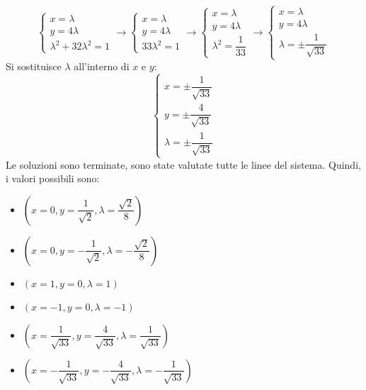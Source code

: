 \documentclass[a4paper]{article}
\begin{document}
	\begin{equation*}
		\begin{cases}
			x = \lambda \\
			y = 4\lambda \\
			\lambda^{2} + 32\lambda^{2} = 1
		\end{cases}
		\longrightarrow
		\begin{cases}
			x = \lambda \\
			y = 4\lambda \\
			33\lambda^{2} = 1
		\end{cases}
		\longrightarrow
		\begin{cases}
			x = \lambda \\
			y = 4\lambda \\
			\lambda^{2} = \dfrac{1}{33}
		\end{cases}
		\longrightarrow
		\begin{cases}
			x = \lambda \\
			y = 4\lambda \\
			\lambda = \pm \dfrac{1}{\sqrt{33}}
		\end{cases}
	\end{equation*}
	Si sostituisce $\lambda$ all'interno di $x$ e $y$:
	\begin{equation*}
		\begin{cases}
			x = \pm \dfrac{1}{\sqrt{33}} \\
			y = \pm \dfrac{4}{\sqrt{33}} \\
			\lambda = \pm \dfrac{1}{\sqrt{33}}
		\end{cases}
	\end{equation*}
	Le soluzioni sono terminate, sono state valutate tutte le linee del sistema. Quindi, i valori possibili sono:
	\begin{itemize}
		\item $\left(x=0, y=\dfrac{1}{\sqrt{2}}, \lambda=\dfrac{\sqrt{2}}{8}\right)$

		\item $\left(x=0, y=-\dfrac{1}{\sqrt{2}}, \lambda=-\dfrac{\sqrt{2}}{8}\right)$

		\item $\left(x=1, y=0, \lambda=1\right)$

		\item $\left(x=-1, y=0, \lambda=-1\right)$

		\item $\left(x=\dfrac{1}{\sqrt{33}}, y=\dfrac{4}{\sqrt{33}}, \lambda=\dfrac{1}{\sqrt{33}}\right)$

		\item $\left(x=-\dfrac{1}{\sqrt{33}}, y=-\dfrac{4}{\sqrt{33}}, \lambda=-\dfrac{1}{\sqrt{33}}\right)$
	\end{itemize}\newpage
\end{document}
